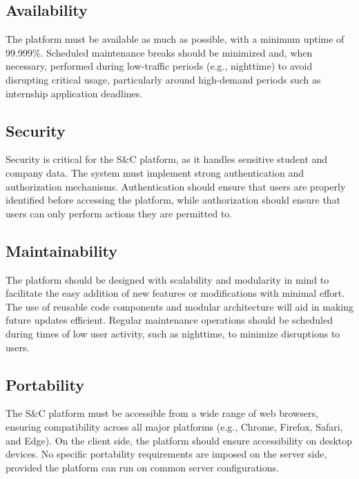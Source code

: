 \subsection{Availability}
The platform must be available as much as possible, with a minimum uptime of 99.999\%. Scheduled maintenance breaks should be minimized and, when necessary, performed during low-traffic periods (e.g., nighttime) to avoid disrupting critical usage, particularly around high-demand periods such as internship application deadlines.

\subsection{Security}
Security is critical for the S\&C platform, as it handles sensitive student and company data. The system must implement strong authentication and authorization mechanisms. Authentication should ensure that users are properly identified before accessing the platform, while authorization should ensure that users can only perform actions they are permitted to.

\subsection{Maintainability}
The platform should be designed with scalability and modularity in mind to facilitate the easy addition of new features or modifications with minimal effort. The use of reusable code components and modular architecture will aid in making future updates efficient. Regular maintenance operations should be scheduled during times of low user activity, such as nighttime, to minimize disruptions to users.

\subsection{Portability}
The S\&C platform must be accessible from a wide range of web browsers, ensuring compatibility across all major platforms (e.g., Chrome, Firefox, Safari, and Edge). On the client side, the platform should ensure  accessibility on desktop devices. No specific portability requirements are imposed on the server side, provided the platform can run on common server configurations.


\newpage
